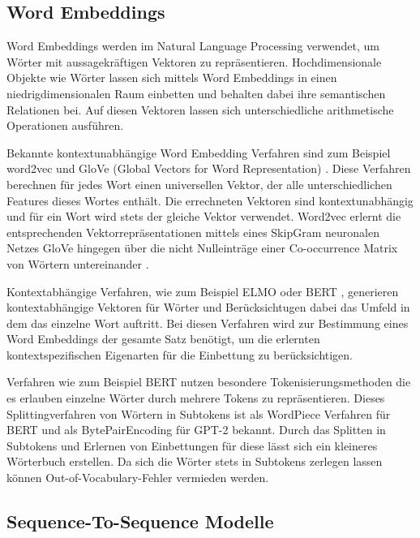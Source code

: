 \subsection{Word Embeddings}
Word Embeddings werden im Natural Language Processing verwendet, um Wörter mit aussagekräftigen Vektoren zu repräsentieren. 
Hochdimensionale Objekte wie Wörter lassen sich mittels Word Embeddings in einen niedrigdimensionalen Raum einbetten und behalten dabei ihre semantischen Relationen bei. 
Auf diesen Vektoren lassen sich unterschiedliche arithmetische Operationen ausführen.

Bekannte kontextunabhängige Word Embedding Verfahren sind zum Beispiel word2vec \citep{word2vec} und GloVe (Global Vectors for Word Representation) \citep{glove}. 
Diese Verfahren berechnen für jedes Wort einen universellen Vektor, der alle unterschiedlichen Features dieses Wortes enthält.
Die errechneten Vektoren sind kontextunabhängig und für ein Wort wird stets der gleiche Vektor verwendet. 
Word2vec erlernt die entsprechenden Vektorrepräsentationen mittels eines SkipGram neuronalen Netzes \citep{word2vec} GloVe hingegen über die nicht Nulleinträge einer Co-occurrence Matrix von Wörtern untereinander \citep{glove}. 

Kontextabhängige Verfahren, wie zum Beispiel ELMO \citep{elmo} oder BERT \citep{DBLP:journals/corr/abs-1810-04805}, generieren kontextabhängige Vektoren für Wörter und Berücksichtugen dabei das Umfeld in dem das einzelne Wort auftritt.
Bei diesen Verfahren wird zur Bestimmung eines Word Embeddings der gesamte Satz benötigt, um die erlernten kontextspezifischen Eigenarten für die Einbettung zu berücksichtigen. 

Verfahren wie zum Beispiel BERT nutzen besondere Tokenisierungsmethoden die es erlauben einzelne Wörter durch mehrere Tokens zu repräsentieren.
Dieses Splittingverfahren von Wörtern in Subtokens ist als WordPiece Verfahren \citep{wordpiece} für BERT und als BytePairEncoding \citep{bytepairencoding} für GPT-2 bekannt. 
Durch das Splitten in Subtokens und Erlernen von Einbettungen für diese lässt sich ein kleineres Wörterbuch erstellen. 
Da sich die Wörter stets in Subtokens zerlegen lassen können Out-of-Vocabulary-Fehler vermieden werden.

\subsection{Sequence-To-Sequence Modelle}


